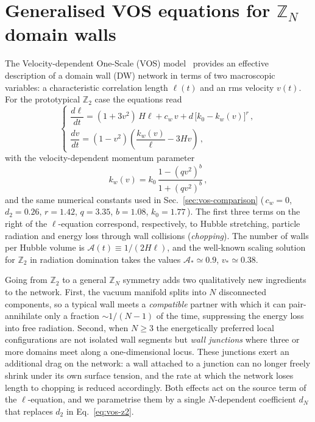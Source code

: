 
\section{Generalised VOS equations for $\mathbb{Z}_N$ domain walls}
\label{sec:vos-zn}

The Velocity-dependent One-Scale (VOS) model~\cite{} provides an effective
description of a domain wall (DW) network in terms of two macroscopic
variables: a characteristic correlation length $\ell(t)$ and an rms
velocity $v(t)$. For the prototypical $\mathbb{Z}_2$ case the equations
read~\cite{}
\begin{equation}
\label{eq:vos-z2}
\begin{cases}
\dfrac{d\ell}{dt} = (1+3v^{2})\,H\ell + c_w\,v + d\,\bigl[k_0 - k_w(v)\bigr]^{r}\,, \\[1.0ex]
\dfrac{dv}{dt}    = (1-v^{2})\left(\dfrac{k_w(v)}{\ell} - 3Hv\right)\,,
\end{cases}
\end{equation}
with the velocity-dependent momentum parameter
\begin{equation}
\label{eq:kw}
k_w(v) = k_0\,\frac{1-(qv^{2})^{b}}{1+(qv^{2})^{b}}\,,
\end{equation}
and the same numerical constants used in Sec.~\ref{sec:vos-comparison}
(\,$c_w \!=\!0$, $d_2\!=\!0.26$, $r\!=\!1.42$, $q\!=\!3.35$, $b\!=\!1.08$,
$k_0\!=\!1.77$\,). The first three terms on the right of the
$\ell$-equation correspond, respectively, to Hubble stretching, particle
radiation and energy loss through wall collisions
(\emph{chopping}). The number of walls per Hubble volume is
$\mathcal{A}(t) \equiv 1/(2H\ell)$, and the well-known scaling solution
for $\mathbb{Z}_2$ in radiation domination takes the values
$\mathcal{A}_{*}\simeq 0.9$, $v_{*}\simeq 0.38$.

Going from $\mathbb{Z}_2$ to a general $\mathbb{Z}_N$ symmetry adds two
qualitatively new ingredients to the network. First, the vacuum manifold
splits into $N$ disconnected components, so a typical wall meets a
\emph{compatible} partner with which it can pair-annihilate only a
fraction $\sim 1/(N-1)$ of the time, suppressing the energy loss into
free radiation. Second, when $N\geq 3$ the energetically preferred local
configurations are not isolated wall segments but \emph{wall junctions}
where three or more domains meet along a one-dimensional locus. These
junctions exert an additional drag on the network: a wall attached to a
junction can no longer freely shrink under its own surface tension, and
the rate at which the network loses length to chopping is reduced
accordingly. Both effects act on the source term of the
$\ell$-equation, and we parametrise them by a single $N$-dependent
coefficient $d_N$ that replaces $d_2$ in Eq.~\eqref{eq:vos-z2}.

